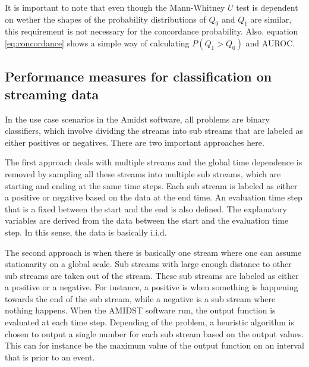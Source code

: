It is important to note that even though the Mann-Whitney $U$ test is dependent on wether the shapes of the probability distributions of $Q_0$ and $Q_1$ are similar, this requirement is not necessary for the concordance probability.  Also. equation \eqref{eq:concordance} shows a simple way of calculating $P(Q_1 > Q_0)$ and AUROC.

\subsection{Performance measures for classification on streaming data}
\label{sec:stream}

In the use case scenarios in the Amidst software, all problems are binary classifiers, which involve dividing the streams into sub streams that are labeled as either positives or negatives.  There are two important approaches here.

The first approach deals with multiple streams and the global time dependence is removed by sampling all these streams into multiple sub streams, which are starting and ending at the same time steps.  Each sub stream is labeled as either a positive or negative based on the data at the end time.  An evaluation time step that is a fixed between the start and the end is also defined.  The explanatory variables are derived from the data between the start and the evaluation time step.  In this sense, the data is basically i.i.d.

The second approach is when there is basically one stream where one can assume stationarity on a global scale.  Sub streams with large enough distance to other sub streams are taken out of the stream.  These sub streams are labeled as either a positive or a negative.  For instance, a positive is when something is happening towards the end of the sub stream, while a negative is a sub stream where nothing happens.  When the AMIDST software run, the output function is evaluated at each time step.  Depending of the problem, a heuristic algorithm is chosen to output a single number for each sub stream based on the output values.  This can for instance be the maximum value of the output function on an interval that is prior to an event.  






 

%
